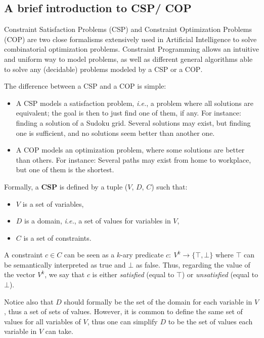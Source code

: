 \documentclass[journal]{IEEEtran}
\newcommand{\minormod}[1]{#1 \xspace}
\newcommand{\csp}{\textsc{CSP}\xspace}
\newcommand{\cop}{\textsc{COP}\xspace}
\newcommand{\ie}{\textit{i.e.}}
\begin{document}

\subsection{A brief introduction to \csp / \cop}

Constraint  Satisfaction Problems  (\csp) and  Constraint Optimization
Problems  (\cop)   are  two  close  formalisms   extensively  used  in
Artificial  Intelligence  to   solve  combinatorial    optimization
problems. Constraint  Programming allows an intuitive  and uniform way
to model  problems, as  well as different  general algorithms able to
solve any \minormod{(decidable)} problems modeled by a \csp or a \cop.

The difference between a \csp and a \cop is simple:
\begin{itemize}
\item A \csp  models a satisfaction problem, \ie, a  problem where all
  solutions are equivalent; the goal is then to just find one of them,
  if any. For  instance: finding a solution of a  Sudoku grid. Several
  solutions may exist, but finding one is sufficient, and no solutions
  seem better than another one.
\item A \cop models an  optimization problem, where some solutions are
  better than others.  For instance: Several paths may exist from home
  to workplace, but one of them is the shortest.
\end{itemize}
Formally, a {\bf \csp} is defined by a tuple ($V$, $D$, $C$) such that:
\begin{itemize}
\item $V$ is a set of variables,
\item $D$ is a domain, \ie, a set of values for variables in $V$,
\item $C$ is a set of constraints.
\end{itemize}

A  constraint  $c   \in  C$  can  be  seen  as   a  $k$-ary  predicate
$c:~V^k\rightarrow\{\top,\bot\}$  where  $\top$  can  be  semantically
interpreted as true and $\bot$ as false. Thus, regarding the value of
the vector $V^k$, we say that $c$ is either {\it satisfied} (equal to
$\top$) or {\it unsatisfied} (equal to $\bot$).

Notice also that $D$ should formally be the set of the domain for each
variable in $V$, thus a set of  sets of values. However, it is common to
define the same set  of values for all variables of  $V$, thus one can
simplify $D$ to be the set of values each variable in $V$ can take.
\end{document}

